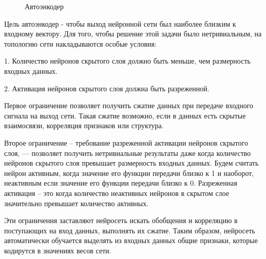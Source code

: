 \documentclass[12pt]{article}
\begin{document}
  \begin{figure}[H]
    \noindent{}
    \caption{Автоэнкодер}
    \label{figCurves}
  \end{figure}

Цель автоэнкодер - чтобы выход нейронной сети был наиболее близким к входному вектору. Для того, чтобы решение этой задачи было нетривиальным, на топологию сети накладываются особые условия:

1. Количество нейронов скрытого слоя должно быть меньше, чем размерность входных данных.

2. Активация нейронов скрытого слоя должна быть разреженной.

Первое ограничение позволяет получить сжатие данных при передаче входного сигнала на выход сети. Такая сжатие возможно, если в данных есть скрытые взаимосвязи, корреляция признаков или структура.

Второе ограничение – требование разреженной активации нейронов скрытого слоя, — позволяет получить нетривиальные результаты даже когда количество нейронов скрытого слоя превышает размерность входных данных. Будем считать нейрон активным, когда значение его функции передачи близко к 1 и наоборот, неактивным если значение его функции передачи близко к 0. Разреженная активация – это когда количество неактивных нейронов в скрытом слое значительно превышает количество активных.

Эти ограничения заставляют нейросеть искать обобщения и корреляцию в поступающих на вход данных, выполнять их сжатие. Таким образом, нейросеть автоматически обучается выделять из входных данных общие признаки, которые кодирутся в значениях весов сети.
\end{document}
